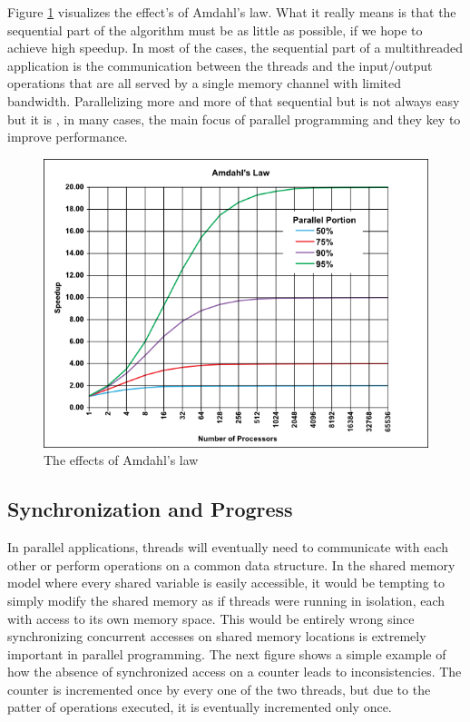 Figure \ref{Amdahls_law} visualizes the effect's of Amdahl's law. What it really means is that the sequential part of the algorithm must be as little as possible, if we hope to achieve high speedup. In most of the cases, the sequential part of a multithreaded application is the communication between the threads and the input/output operations that are all served by a single memory channel with limited bandwidth. Parallelizing more and more of that sequential but is not always easy but it is , in many cases, the main focus of parallel programming and they key to improve performance. 
\begin{figure} 
 \centering 
  \includegraphics[scale=0.5]{Amdahls_law.png} 
\caption{The effects of Amdahl's law} 
\label{Amdahls_law} 
\end{figure} 

\subsection{Synchronization and Progress}

In parallel applications, threads will eventually need to communicate with each other or perform operations on a common data structure. In the shared memory model where every shared variable is easily accessible, it would be tempting to simply modify the shared memory as if threads were running in isolation, each with access to its own memory space. This would be entirely wrong since synchronizing concurrent accesses on shared memory locations is extremely important in parallel programming. The next figure shows a simple example of how the absence of synchronized access on a counter leads to inconsistencies. The counter is incremented once by every one of the two threads, but due to the patter of operations executed, it is eventually incremented only once.

